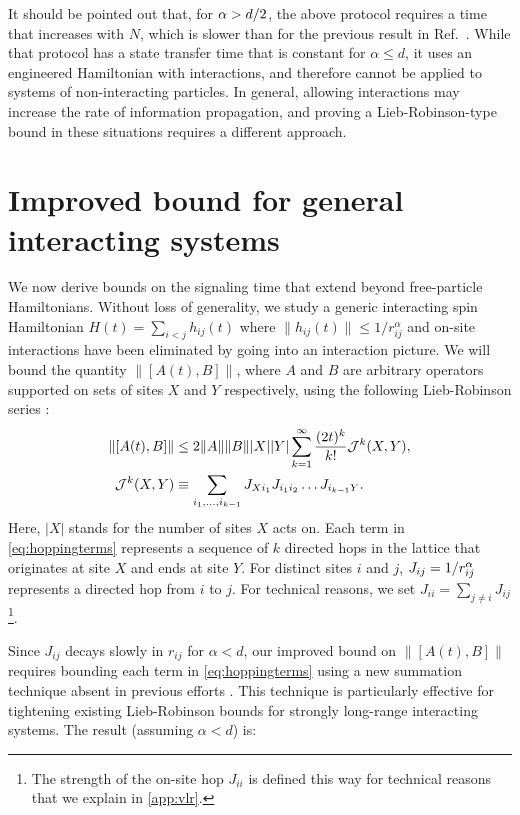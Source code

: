 It should be pointed out that, for $\alpha > d/2$, the above protocol requires a time that increases with $N$, which is slower than for the previous result in Ref.~\cite{Eldredge2017}.
While that protocol has a state transfer time that is constant for $\alpha\le d$, it uses an engineered Hamiltonian with interactions, and therefore cannot be applied to systems of non-interacting particles.
In general, allowing interactions may increase the rate of information propagation, and proving a Lieb-Robinson-type bound in these situations requires a different approach.

\section{Improved bound for general interacting systems}
We now derive bounds on the signaling time that extend beyond free-particle Hamiltonians.
Without loss of generality, we study a generic interacting spin Hamiltonian $ 	H(t) = \sum_{i<j} h_{ij}(t)$ where $\|h_{ij}(t)\|\le 1/r_{ij}^{\alpha}$ and on-site interactions have been eliminated by going into an interaction picture.
We will bound the quantity $\|[A(t),B]\|$, where $A$ and $B$ are arbitrary operators supported on sets of sites $X$ and $Y$ respectively,  using the following Lieb-Robinson series \cite{HK}:
\begin{align}
	\label{eq:HKseries1}
	\|[A(t),B]\| &\le 2\|A\|\|B\||X||Y|\sum_{k=1}^{\infty}\frac{(2t)^{k}}{k!} \mathcal{J}^k(X,Y), \\
    \label{eq:hoppingterms}
	\mathcal{J}^k(X,Y) &\equiv \sum_{i_{1},\dots,i_{k-1}}J_{Xi_{1}}J_{i_{1}i_{2}}\dots J_{i_{k-1}Y}.
\end{align}
Here, $|X|$ stands for the number of sites $X$ acts on. Each term in \cref{eq:hoppingterms} represents a sequence of $k$ directed hops in the lattice that originates at site $X$ and ends at site $Y$.
For distinct sites $i$ and $j$, $J_{ij}=1/r_{ij}^{\alpha}$ represents a directed hop from $i$ to $j$.
For technical reasons, we set $J_{ii} = \sum_{j\ne i} J_{ij}$ \footnote{
The strength of the on-site hop $J_{ii}$ is defined this way for technical reasons that we explain in \cref{app:vlr}.}.

Since $J_{ij}$ decays slowly in $r_{ij}$ for $\alpha<d$, our improved bound on $\|[A(t),B]\|$ requires bounding each term in \cref{eq:hoppingterms} using a new summation technique  absent in previous efforts \cite{HK,Storch15}. This technique is particularly effective for tightening existing Lieb-Robinson bounds for strongly long-range interacting systems. The result (assuming $\alpha<d$) is:


